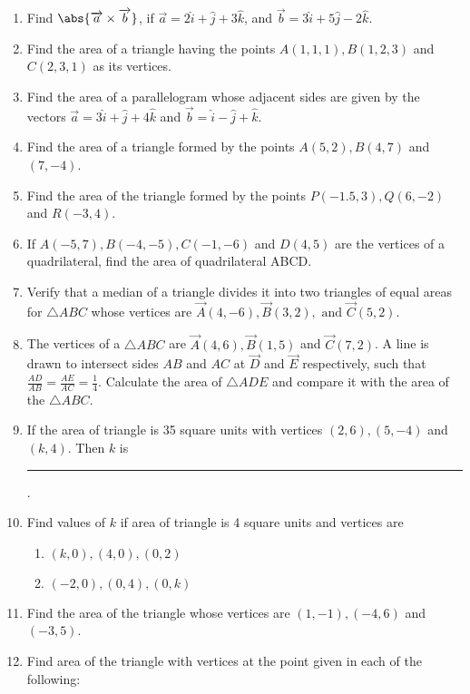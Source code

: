 \begin{enumerate}[label=\thesubsection.\arabic*,ref=\thesubsection.\theenumi]
\item Find $\abs{\overrightarrow{a} \times \overrightarrow{b}}$, if $\overrightarrow{a} = 2\hat{i} +\hat{j} +3\hat{k}$, and $\overrightarrow{b} = 3\hat{i} +5\hat{j} -2\hat{k}$.
\item Find the area of a triangle having the points $A(1,1,1), B(1,2,3)$ and $C(2,3,1)$ as its vertices.
\item Find the area of a parallelogram whose adjacent sides are given by the vectors $\overrightarrow{a}=3\hat{i} +\hat{j} +4\hat{k}$ and $\overrightarrow{b}=\hat{i} -\hat{j} +\hat{k}$.
\item Find the area of a triangle formed by the points $A(5,2), B(4,7)$ and $(7,-4)$.
\item Find the area of the triangle formed by the points $P(-1.5,3), Q(6,-2)$ and $R(-3,4)$.
\item If $A(-5,7), B(-4,-5), C(-1,-6)$ and $D(4,5)$ are the vertices of a quadrilateral, find the area of quadrilateral ABCD.
\item Verify that a median of a triangle divides it into two triangles of equal areas for $\triangle ABC$ whose vertices are $\vec{A}(4, -6), \vec{B}(3, 2), \text{ and } \vec{C}(5, 2)$. 
		\label{10/7/3/5}
		\\
\solution
		
\item The vertices of a $\triangle ABC$ are $\vec{A}(4,6), \vec{B}(1,5)$ and  $\vec{C}(7,2)$. A line is drawn to intersect sides $AB$ and $AC$ at $\vec{D}$ and $\vec{E}$ respectively, such that $\frac{AD}{AB} = \frac{AE}{AC} = \frac{1}{4}$. Calculate the area of $\triangle ADE$ and compare it with the area of the $\triangle ABC$.
\\
\solution
	
\item If the area of triangle is 35 square units with vertices $(2,6), (5,-4)$ and $(k,4)$. Then $k$ is \rule{1cm}{0.1pt}.
\item Find values of $k$ if area of triangle is 4 square units and vertices are
\begin{enumerate}
\item $(k,0), (4,0), (0,2)$
\item $(-2,0), (0,4), (0,k)$
\end{enumerate}
\item Find the area of the triangle whose vertices are $(1,-1), (-4,6)$ and $(-3,5)$.
\item Find area of the triangle with vertices at the point given in each of the following:

\end{enumerate}
